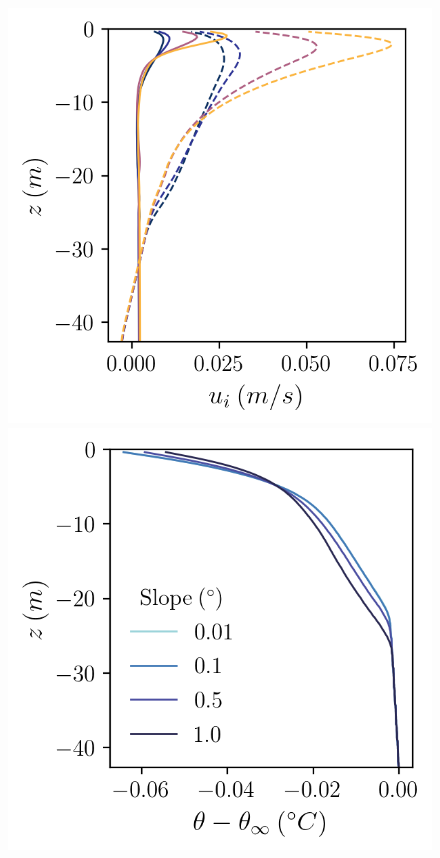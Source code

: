 \documentclass[draft]{styles/agujournal2019}
\begin{document}
\begin{figure}[h!]
\begin{minipage}{0.33\textwidth}
    \end{minipage}%
    \begin{minipage}{0.33\textwidth}
        \includegraphics[trim={0 0 0 0},clip, width=\textwidth]{Figures/velocity_cmp_dT_43h_tav13h_z_profile.png}
    \end{minipage}
    \newline
    \begin{minipage}{0.33\textwidth}
        \includegraphics[trim={0 0cm 0 0},clip, width=\textwidth]{Figures/pt_cmp_dslope_43h_tav13h_z_profile.png}

\end{minipage}
\end{figure}
\end{document}
